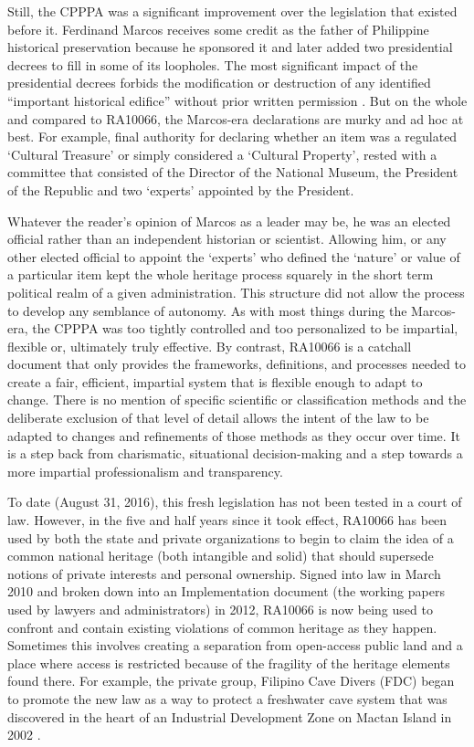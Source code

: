 Still, the CPPPA was a significant improvement over the legislation that existed before it. Ferdinand Marcos receives some credit as the father of Philippine historical preservation because he sponsored it and later added two presidential decrees \parencites{President_260}{President_1505} to fill in some of its loopholes. 
The most significant impact of the presidential decrees forbids the modification or destruction of any identified “important historical edifice” without prior written permission \parencite[2]{Tankersley_2014}. 
But on the whole and compared to RA10066, the Marcos-era declarations are murky and ad hoc at best. For example, final authority for declaring whether an item was a regulated ‘Cultural Treasure’ or simply considered a ‘Cultural Property’, rested with a committee that consisted of the Director of the National Museum, the President of the Republic and two ‘experts’ appointed by the President. 

Whatever the reader’s opinion of Marcos as a leader may be, he was an elected official rather than an independent historian or scientist. Allowing him, or any other elected official to appoint the ‘experts’ who defined the ‘nature’ or value of a particular item kept the whole heritage process squarely in the short term political realm of a given administration.  This structure did not allow the process to develop any semblance of autonomy. As with most things during the Marcos-era, the CPPPA was too tightly controlled and too personalized to be impartial, flexible or, ultimately truly effective. By contrast, RA10066 is a catchall document that only provides the frameworks, definitions, and processes needed to create a fair, efficient, impartial system that is flexible enough to adapt to change. There is no mention of specific scientific or classification methods and the deliberate exclusion of that level of detail allows the intent of the law to be adapted to changes and refinements of those methods as they occur over time. It is a step back from charismatic, situational decision-making and a step towards a more impartial professionalism and transparency.

To date (August 31, 2016), this fresh legislation has not been tested in a court of law. However, in the five and half years since it took effect, RA10066 has been used by both the state and private organizations to begin to claim the idea of a common national heritage (both intangible and solid) that should supersede notions of private interests and personal ownership. Signed into law in March 2010 and broken down into an Implementation document (the working papers used by lawyers and administrators) in 2012, RA10066 is now being used to confront and contain existing violations of common heritage as they happen. Sometimes this involves creating a separation from open-access public land and a place where access is restricted because of the fragility of the heritage elements found there. For example, the private group, Filipino Cave Divers (FDC) began to promote the new law as a way to protect a freshwater cave system that was discovered in the heart of an Industrial Development Zone on Mactan Island in 2002 \parencite{Divers_2014a}. 

